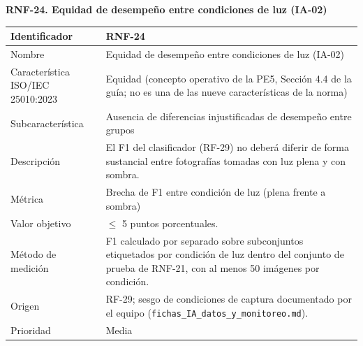 \documentclass[12pt,a4paper]{article}
\begin{document}
\begin{minipage}{\linewidth}
\bigskip
\noindent\textbf{RNF-24. Equidad de desempeño entre condiciones de luz (IA-02)}
\label{tab:RNF-24}

\begin{center}
\begin{tabular}{|p{4.2cm}|p{10cm}|}
\hline
Identificador & RNF-24 \\
\hline
Nombre & Equidad de desempeño entre condiciones de luz (IA-02) \\
\hline
Característica ISO/IEC 25010:2023 & Equidad (concepto operativo de la PE5, Sección 4.4 de la guía; no es una de las nueve características de la norma) \\
\hline
Subcaracterística & Ausencia de diferencias injustificadas de desempeño entre grupos \\
\hline
Descripción & El F1 del clasificador (RF-29) no deberá diferir de forma sustancial entre fotografías tomadas con luz plena y con sombra. \\
\hline
Métrica & Brecha de F1 entre condición de luz (plena frente a sombra) \\
\hline
Valor objetivo & $\leq$ 5 puntos porcentuales. \\
\hline
Método de medición & F1 calculado por separado sobre subconjuntos etiquetados por condición de luz dentro del conjunto de prueba de RNF-21, con al menos 50 imágenes por condición. \\
\hline
Origen & RF-29; sesgo de condiciones de captura documentado por el equipo (\texttt{fichas\_IA\_datos\_y\_monitoreo.md}). \\
\hline
Prioridad & Media \\
\hline
\end{tabular}
\end{center}
\end{minipage}
\end{document}
